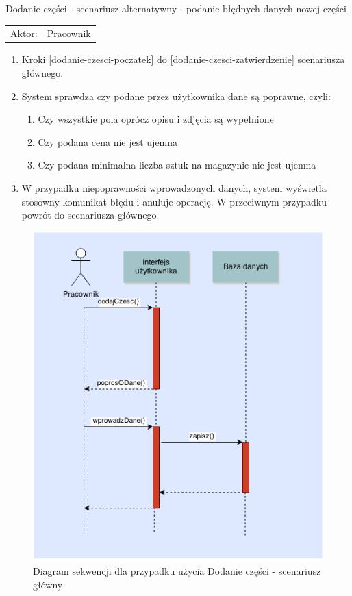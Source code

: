   \item Dodanie części - scenariusz alternatywny - podanie błędnych danych nowej części \\
  \begin{tabularx}{\linewidth}{ c X}
  Aktor: & Pracownik \\
  \end{tabularx}
   \begin{enumerate}
    \item Kroki \ref{dodanie-czesci-poczatek} do \ref{dodanie-czesci-zatwierdzenie} scenariusza głównego.
    \item System sprawdza czy podane przez użytkownika dane są poprawne, czyli:
    \begin{enumerate}
      \item Czy wszystkie pola oprócz opisu i zdjęcia są wypełnione
      \item Czy podana cena nie jest ujemna
      \item Czy podana minimalna liczba sztuk na magazynie nie jest ujemna
    \end{enumerate}
    \item W przypadku niepoprawności wprowadzonych danych, system wyświetla stosowny komunikat błędu i anuluje operację. W przeciwnym przypadku powrót do scenariusza głównego.
  \end{enumerate}
  	
\begin{figure}[h!]
    \includegraphics[width=\textwidth,
    height=0.7\textheight]{graphics/UseCase/Czesci/DodanieCzesciSD.png}
  \caption{Diagram sekwencji dla przypadku użycia Dodanie części - scenariusz główny}
\end{figure}